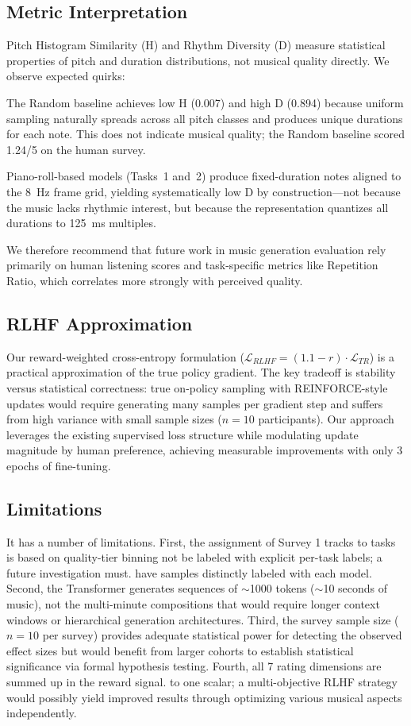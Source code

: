 \documentclass[conference]{IEEEtran}
\begin{document}
\subsection{Metric Interpretation}

Pitch Histogram Similarity (H) and Rhythm Diversity (D) measure statistical properties of pitch and duration distributions, not musical quality directly. We observe expected quirks:

The Random baseline achieves low H (0.007) and high D (0.894) because uniform sampling naturally spreads across all pitch classes and produces unique durations for each note. This does not indicate musical quality; the Random baseline scored 1.24/5 on the human survey.

Piano-roll-based models (Tasks~1 and~2) produce fixed-duration notes aligned to the 8~Hz frame grid, yielding systematically low D by construction---not because the music lacks rhythmic interest, but because the representation quantizes all durations to 125~ms multiples.

We therefore recommend that future work in music generation evaluation rely primarily on human listening scores and task-specific metrics like Repetition Ratio, which correlates more strongly with perceived quality.

\subsection{RLHF Approximation}

Our reward-weighted cross-entropy formulation ($\mathcal{L}_{RLHF} = (1.1 - r) \cdot \mathcal{L}_{TR}$) is a practical approximation of the true policy gradient. The key tradeoff is stability versus statistical correctness: true on-policy sampling with REINFORCE-style updates would require generating many samples per gradient step and suffers from high variance with small sample sizes ($n=10$ participants). Our approach leverages the existing supervised loss structure while modulating update magnitude by human preference, achieving measurable improvements with only 3 epochs of fine-tuning.

\subsection{Limitations}

It has a number of limitations. First, the assignment
of Survey 1 tracks to tasks is based on quality-tier binning not be labeled with explicit per-task labels; a future investigation must. have samples distinctly labeled with each model. Second, the Transformer generates sequences of $\sim$1000 tokens ($\sim$10 seconds of music), not the multi-minute compositions that would require longer context windows or hierarchical generation architectures. Third, the survey sample size ($n=10$ per survey) provides adequate statistical power for detecting the observed effect sizes but would benefit from larger cohorts to establish statistical significance via formal hypothesis testing. Fourth, all 7 rating dimensions are summed up in the reward signal.
to one scalar; a multi-objective RLHF strategy would possibly yield improved results through optimizing various musical aspects independently.
\end{document}

